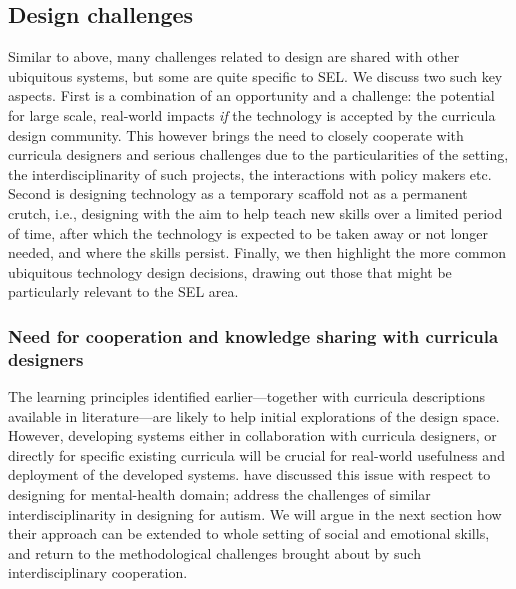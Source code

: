 \documentclass[prodmode,acmtochi]{acmsmall}
\newcommand{\rephrase}[1]{\textrm{\textrm{\textcolor{gray}{#1}}}}
\begin{document}
\subsection{Design challenges}

Similar to above, many challenges related to design are shared with other ubiquitous systems, but some are quite specific to SEL. We discuss two such key aspects. First is a combination of an opportunity and a challenge: the potential for large scale, real-world impacts \emph{if} the technology is accepted by the curricula design community. This however brings the need to closely cooperate with curricula designers and serious challenges due to the particularities of the setting, the interdisciplinarity of such projects, the interactions with policy makers etc. Second is designing technology as a temporary scaffold not as a permanent crutch, i.e., designing with the aim to help teach new skills over a limited period of time, after which the technology is expected to be taken away or not longer needed, and where the skills persist. 
Finally, we then highlight the more common ubiquitous technology design decisions, drawing out those that might be particularly relevant to the SEL area.
 
        \subsubsection{Need for cooperation and knowledge sharing with curricula designers}
        The learning principles identified earlier---together with curricula descriptions available in literature---are likely to help initial explorations of the design space. However, developing systems either in collaboration with curricula designers, or directly for specific existing curricula will be crucial for real-world usefulness and deployment of the developed systems. %
         have discussed this issue with respect to designing for mental-health domain;   address the challenges of similar interdisciplinarity in designing for autism. We will argue in the next section how their approach can be extended to whole setting of social and emotional skills, and return to the methodological challenges brought about by such interdisciplinary cooperation. 
\end{document}
